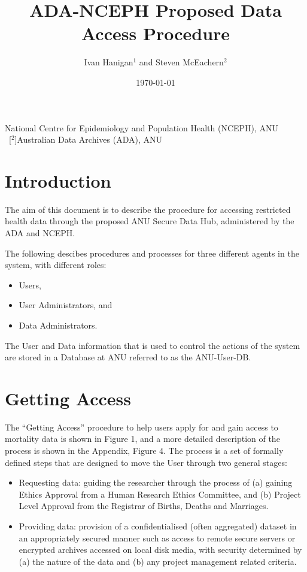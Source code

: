 \documentclass[a4paper]{article}
\title{ADA-NCEPH Proposed Data Access Procedure}
\author{Ivan Hanigan$^1$ and Steven McEachern$^2$}
\date{\today}
\begin{document}
\maketitle

\noindent [$^1$]National Centre for Epidemiology and Population Health (NCEPH), ANU \\\ [$^2$]Australian Data Archives (ADA), ANU
\tableofcontents



\section{Introduction}
\label{sec-1}

The aim of this document is to describe the procedure for accessing restricted health data through the proposed ANU Secure Data Hub, administered by the ADA and NCEPH.

The following descibes procedures and processes for three different agents in the system, with different roles:
\begin{itemize}
\item Users,
\item User Administrators, and
\item Data Administrators.
\end{itemize}

The User and Data information that is used to control the actions of the system are stored in a Database at ANU referred to as the ANU-User-DB.
\newpage
\section{Getting Access}
\label{sec-2}

The ``Getting Access'' procedure to help users apply for and gain access to mortality data is shown in Figure 1, and a more detailed description of the process is shown in the Appendix, Figure 4. The process is a set of formally defined steps that are designed to move the User through two general stages:
\begin{itemize}
\item Requesting data: guiding the researcher through the process of (a) gaining Ethics Approval from a Human Research Ethics Committee, and (b) Project Level Approval from the Registrar of Births, Deaths and Marriages.
\item Providing data: provision of a confidentialised (often aggregated) dataset in an appropriately secured manner such as access to remote secure servers or encrypted archives accessed on local disk media, with security determined by (a) the nature of the data and (b) any project management related criteria.
\end{itemize}
\end{document}
